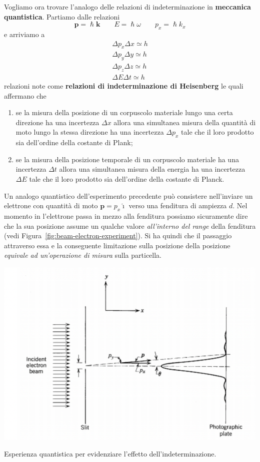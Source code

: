 Vogliamo ora trovare l'analogo delle relazioni di indeterminazione in
\textbf{meccanica quantistica}.
Partiamo dalle relazioni \[
	\bm{p} = \hslash \bm{k} \qquad E = \hslash \omega \qquad p_{x} = \hslash k_{x}
\] e arriviamo a
\begin{gather}
	\Delta p_{x} \Delta x \simeq h\\
	\Delta p_{y} \Delta y \simeq h\\
	\Delta p_{z} \Delta z \simeq h\\
	\Delta E \Delta t \simeq h
\end{gather}
relazioni note come \textbf{relazioni di indeterminazione di
	Heisenberg} le quali affermano che
\begin{enumerate}
	\tightlist
	\item
	      se la misura della posizione di un corpuscolo materiale lungo una
	      certa direzione ha una incertezza \(\Delta x\) allora una simultanea
	      misura della quantità di moto lungo la stessa direzione ha una
	      incertezza \(\Delta p_x\) tale che il loro prodotto sia dell'ordine
	      della costante di Plank;
	\item
	      se la misura della posizione temporale di un corpuscolo materiale ha
	      una incertezza \(\Delta t\) allora una simultanea misura della energia
	      ha una incertezza \(\Delta E\) tale che il loro prodotto sia
	      dell'ordine della costante di Planck.
\end{enumerate}

Un analogo quantistico dell'esperimento precedente può consistere
nell'inviare un elettrone con quantità di moto
\(\bm{p} = p_{x} \hat{\imath}\) verso una fenditura di ampiezza \(d\).
Nel
momento in l'elettrone passa in mezzo alla fenditura possiamo
sicuramente dire che la sua posizione assume un qualche valore
\emph{all'interno del range} della fenditura (vedi Figura~\ref{fig:beam-electron-experiment}).
Si ha quindi che il passaggio attraverso essa e la conseguente limitazione sulla posizione
della posizione \emph{equivale ad un'operazione di misura} sulla
particella.

\begin{marginfigure}
	\includegraphics[width = 1.3 \textwidth, height = 1.3 \textheight]{figs/beam-electron-experiment}
	\caption{Esperienza quantistica per evidenziare l'effetto dell'indeterminazione.}
	\label{fig:beam-electron-experiment}
\end{marginfigure}

